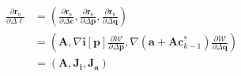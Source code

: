 \begin{equation}
    \begin{aligned}
		\frac{\partial \mathbf{r}_b}{\partial \Delta \boldsymbol{\ell}}& = \left( \frac{\partial \mathbf{r}_b}{\partial \Delta \mathbf{c}}, \frac{\partial \mathbf{r}_b}{\partial \Delta \mathbf{p}}, \frac{\partial \mathbf{r}_b}{\partial \Delta \mathbf{q}} \right)
		\\
		& = \left( \mathbf{A}, \nabla \mathbf{i}[\mathbf{p}] \frac{\partial \mathcal{W}}{\partial \Delta \mathbf{p}}, \nabla (\mathbf{a} + \mathbf{A}\mathbf{c}_{k-1}^*) \frac{\partial \mathcal{W}}{\partial \Delta \mathbf{q}} \right)
		\\
		& = \left( \mathbf{A}, \mathbf{J}_{\mathbf{i}}, \mathbf{J}_{\mathbf{a}} \right)
    \label{eq:bidirectional_jacobian}
    \end{aligned}
\end{equation}





